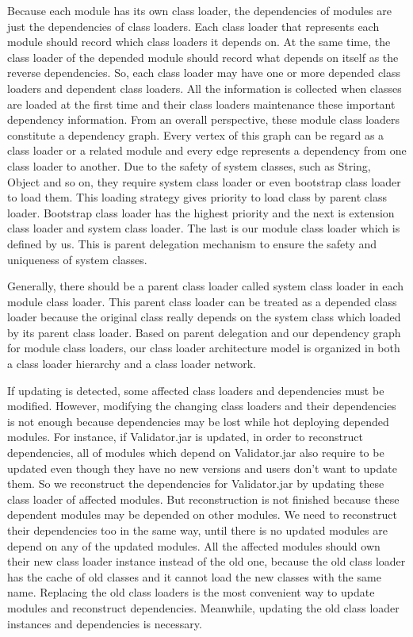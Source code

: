 \documentclass[conference]{IEEEtran}
\begin{document}
Because each module has its own class loader, the dependencies of modules are just the dependencies of class loaders.
Each class loader that represents each module should record which class loaders it depends on.
At the same time, the class loader of the depended module should record what depends on itself as the reverse dependencies.
So, each class loader may have one or more depended class loaders and dependent class loaders.
All the information is collected when classes are loaded at the first time and their class loaders maintenance these important dependency information. 
From an overall perspective, these module class loaders constitute a dependency graph.
Every vertex of this graph can be regard as a class loader or a related module and every edge represents a dependency from one class loader to another.
Due to the safety of system classes, such as String, Object and so on, they require system class loader or even bootstrap class loader to load them.
This loading strategy gives priority to load class by parent class loader.
Bootstrap class loader has the highest priority and the next is extension class loader and system class loader.
The last is our module class loader which is defined by us.
This is parent delegation mechanism\cite{parent_delegation} to ensure the safety and uniqueness of system classes.

Generally, there should be a parent class loader called system class loader in each module class loader.
This parent class loader can be treated as a depended class loader because the original class really depends on the system class which loaded by its parent class loader.
Based on parent delegation and our dependency graph for module class loaders, our class loader architecture model is organized in both a class loader hierarchy and a class loader network\cite{class_loader_patent}.

If updating is detected, some affected class loaders and dependencies must be modified.
However, modifying the changing class loaders and their dependencies is not enough because dependencies may be lost while hot deploying depended modules.
For instance, if Validator.jar is updated, in order to reconstruct dependencies, all of modules which depend on Validator.jar also require to be updated even though they have no new versions and users don't want to update them.
So we reconstruct the dependencies for Validator.jar by updating these class loader of affected modules.
But reconstruction is not finished because these dependent modules may be depended on other modules.
We need to reconstruct their dependencies too in the same way, until there is no updated modules are depend on any of the updated modules.
All the affected modules should own their new class loader instance instead of the old one, because the old class loader has the cache of old classes and it cannot load the new classes with the same name.
Replacing the old class loaders is the most convenient way to update modules and reconstruct dependencies.
Meanwhile, updating the old class loader instances and dependencies is necessary. 
\end{document}
